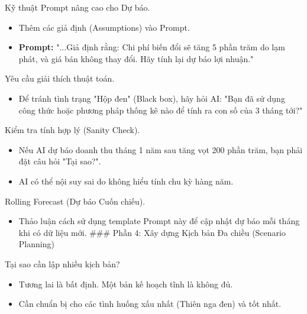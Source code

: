 \documentclass[aspectratio=169]{beamer}
\begin{document}
\begin{frame}{Kỹ thuật Prompt nâng cao cho Dự báo.}
    \begin{itemize}
        \item Thêm các giả định (Assumptions) vào Prompt.
        \item \textbf{Prompt:} "...Giả định rằng: Chi phí biến đổi sẽ tăng 5 phần trăm do lạm phát, và giá bán không thay đổi. Hãy tính lại dự báo lợi nhuận."
    \end{itemize}
\end{frame}


\begin{frame}{Yêu cầu giải thích thuật toán.}
    \begin{itemize}
        \item Để tránh tình trạng "Hộp đen" (Black box), hãy hỏi AI: "Bạn đã sử dụng công thức hoặc phương pháp thống kê nào để tính ra con số của 3 tháng tới?"
    \end{itemize}
\end{frame}


\begin{frame}{Kiểm tra tính hợp lý (Sanity Check).}
    \begin{itemize}
        \item Nếu AI dự báo doanh thu tháng 1 năm sau tăng vọt 200 phần trăm, bạn phải đặt câu hỏi "Tại sao?".
        \item AI có thể nội suy sai do không hiểu tính chu kỳ hàng năm.
    \end{itemize}
\end{frame}


\begin{frame}{Rolling Forecast (Dự báo Cuốn chiếu).}
    \begin{itemize}
        \item Thảo luận cách sử dụng template Prompt này để cập nhật dự báo mỗi tháng khi có dữ liệu mới.
        ### Phần 4: Xây dựng Kịch bản Đa chiều (Scenario Planning)
    \end{itemize}
\end{frame}


\begin{frame}{Tại sao cần lập nhiều kịch bản?}
    \begin{itemize}
        \item Tương lai là bất định. Một bản kế hoạch tĩnh là không đủ.
        \item Cần chuẩn bị cho các tình huống xấu nhất (Thiên nga đen) và tốt nhất.
    \end{itemize}
\end{frame}
\end{document}
